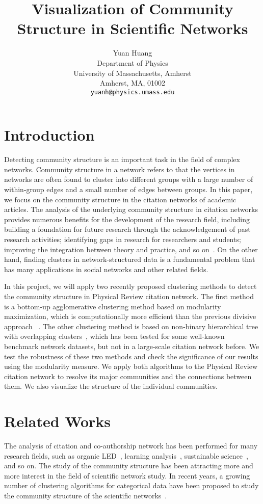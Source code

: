 \documentclass{article} %
\title{Visualization of Community Structure in Scientific Networks}
\author{
Yuan Huang \\
Department of Physics\\
University of Massachusetts, Amherst\\
Amherst, MA, 01002 \\
\texttt{yuanh@physics.umass.edu} \\
}
\begin{document}
\maketitle

\section{Introduction}
\label{intro}

Detecting community structure is an important task in the field of complex networks. Community structure in a network refers to that the vertices in networks are often found to cluster into different groups with a large number of within-group edges and a small number of edges between groups. In this paper, we focus on the community structure in the citation networks of academic articles. The analysis of the underlying community structure in citation networks provides numerous benefits for the development of the research field, including building a foundation for future research through the acknowledgement of past research activities; identifying gaps in research for researchers and students; improving the integration between theory and practice, and so on~\cite{phys_rev, OLED, learning_analytics, sustain}. On the other hand, finding clusters in network-structured data is a fundamental problem that has many applications in social networks and other related fields. 

In this project, we will apply two recently proposed clustering methods\cite{bottom_up, new_method} to detect the community structure in Physical Review citation network. The first method is a bottom-up agglomerative clustering method based on modularity maximization, which is computationally more efficient than the previous divisive approach ~\cite{phys_rev}. The other clustering method is based on non-binary hierarchical tree with overlapping clusters~\cite{new_method}, which has been tested for some well-known benchmark network datasets, but not in a large-scale citation network before. We test the robustness of these two methods and check the significance of our results using the modularity measure. We apply both algorithms to the Physical Review citation network to resolve its major communities and the connections between them. We also visualize the structure of the individual communities.


\section{Related Works}
\label{related}
The analysis of citation and co-authorship network has been performed for many research fields, such as organic LED~\cite{OLED}, learning analysis~\cite{learning_analytics}, sustainable science~\cite{sustain}, and so on. The study of the community structure has been attracting more and more interest in the field of scientific network study. In recent years, a growing number of clustering algorithms for categorical data have been proposed to study the community structure of the scientific networks~\cite{Newman_divisive, bottom_up, new_method, Newman_evaluation,  method_review, Newman_algorithm}. 
\end{document}

